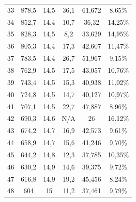 \begin{longtable}[H]{cccccc}
  33          & 878,5                & 14,5          & 36,1           & 61,672        & 8,65\%                             \\
  34          & 852,7                & 14,4          & 10,7           & 36,32         & 14,25\%                            \\
  35          & 828,3                & 14,5          & 8,2            & 33,629        & 14,95\%                            \\
  36          & 805,3                & 14,4          & 17,3           & 42,607        & 11,47\%                            \\
  37          & 783,5                & 14,4          & 26,7           & 51,967        & 9,15\%                             \\
  38          & 762,9                & 14,5          & 17,5           & 43,057        & 10,76\%                            \\
  39          & 743,4                & 14,5          & 15,3           & 40,938        & 11,02\%                            \\
  40          & 724,8                & 14,5          & 14,7           & 40,127        & 10,97\%                            \\
  41          & 707,1                & 14,5          & 22,7           & 47,887        & 8,96\%                             \\
  42          & 690,3                & 14,6          & N/A            & 26            & 16,12\%                            \\
  43          & 674,2                & 14,7          & 16,9           & 42,573        & 9,61\%                             \\
  44          & 658,9                & 14,7          & 15,6           & 41,246        & 9,70\%                             \\
  45          & 644,2                & 14,8          & 12,3           & 37,785        & 10,35\%                            \\
  46          & 630,2                & 14,9          & 14,6           & 39,375        & 9,72\%                             \\
  47          & 616,8                & 14,9          & 19,2           & 45,456        & 8,24\%                             \\
  48          & 604                  & 15            & 11,2           & 37,461        & 9,79\%                             \\

\end{longtable}
